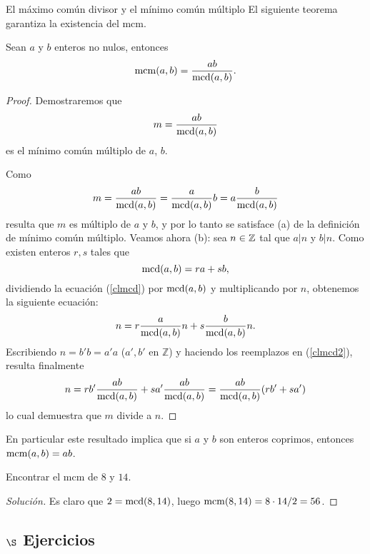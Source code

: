 \begin{section}{El máximo común divisor y el mínimo común
múltiplo}
El siguiente teorema garantiza la existencia del mcm.

\begin{teorema}\label{t1.7.2} Sean $a$ y $b$ enteros no nulos, entonces
$$
\operatorname{mcm}(a,b)=\frac{a b}{\operatorname{mcd}(a,b)}.
$$
\end{teorema}
\begin{proof} Demostraremos que
$$
m=\frac{a b}{\operatorname{mcd}(a,b)}
$$
es el mínimo común múltiplo de $a$, $b$.

Como
$$
m=\frac{a b}{\operatorname{mcd}(a,b)}=\frac{a}{\operatorname{mcd}(a,b)} b
=a\frac{b}{\operatorname{mcd}(a,b)}
$$
resulta que $m$ es múltiplo de $a$ y $b$, y por lo tanto se satisface (a) de la definición de mínimo común múltiplo. Veamos ahora (b): sea $n \in {\mathbb Z}$ tal que  $a|n$ y $b|n$. Como  existen enteros $r,s$ tales que 
\begin{equation}\label{clmcd}
\operatorname{mcd}(a,b)=ra+sb,
\end{equation} 
dividiendo la ecuación (\ref{clmcd}) por $\operatorname{mcd}(a,b)$ y multiplicando por $n$, obtenemos la si\-guien\-te ecuación:
\begin{equation}\label{clmcd2}
n= r\frac{a}{\operatorname{mcd}(a,b)}n + s\frac{b}{\operatorname{mcd}(a,b)}n.
\end{equation} 
Escribiendo $n=b'b=a'a$ ($a',b'$ en $\mathbb Z$) y haciendo los reemplazos en (\ref{clmcd2}), resulta
finalmente
\begin{equation}\label{clmcd3}
n= rb'\frac{a b}{\operatorname{mcd}(a,b)}+sa'\frac{a b}{\operatorname{mcd}(a,b)}= \frac{a
b}{\operatorname{mcd}(a,b)}(rb'+sa')
\end{equation}
lo cual demuestra que $m$ divide a $n$.
\end{proof}

En particular este resultado implica que si $a$ y $b$ son enteros
coprimos, entonces $\operatorname{mcm}(a,b)=ab$.


\begin{ejemplo} Encontrar el  mcm de $8$ y $14$.
	\begin{proof}[Solución] 
		Es claro que $2 = \operatorname{mcd}(8,14)$, luego $\operatorname{mcm}(8,14) = 8 \cdot 14 / 2 = 56$. 
	\end{proof}
\end{ejemplo}

\subsection*{\Large $\S$ Ejercicios}


\end{section}
